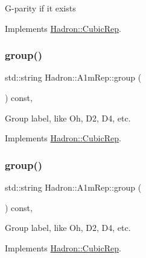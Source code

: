 G-\/parity if it exists 

Implements \mbox{\hyperlink{structHadron_1_1CubicRep_a52104e43266d1614c00bbd1c3b395458}{Hadron\+::\+Cubic\+Rep}}.

\mbox{\label{structHadron_1_1A1mRep_ae00884f3e71e9d2bae09de842d23df0d}} 
\subsubsection{\texorpdfstring{group()}{group()}\hspace{0.1cm}{\footnotesize\ttfamily [1/2]}}
{\footnotesize\ttfamily std\+::string Hadron\+::\+A1m\+Rep\+::group (\begin{DoxyParamCaption}{ }\end{DoxyParamCaption}) const\hspace{0.3cm}{\ttfamily [inline]}, {\ttfamily [virtual]}}

Group label, like Oh, D2, D4, etc. 

Implements \mbox{\hyperlink{structHadron_1_1CubicRep_a0748f11ec87f387062c8e8981339a29c}{Hadron\+::\+Cubic\+Rep}}.

\mbox{\label{structHadron_1_1A1mRep_ae00884f3e71e9d2bae09de842d23df0d}} 
\subsubsection{\texorpdfstring{group()}{group()}\hspace{0.1cm}{\footnotesize\ttfamily [2/2]}}
{\footnotesize\ttfamily std\+::string Hadron\+::\+A1m\+Rep\+::group (\begin{DoxyParamCaption}{ }\end{DoxyParamCaption}) const\hspace{0.3cm}{\ttfamily [inline]}, {\ttfamily [virtual]}}

Group label, like Oh, D2, D4, etc. 

Implements \mbox{\hyperlink{structHadron_1_1CubicRep_a0748f11ec87f387062c8e8981339a29c}{Hadron\+::\+Cubic\+Rep}}.

\mbox{\label{structHadron_1_1A1mRep_a99e7f10bdf161f356d1061172d776f41}} 
